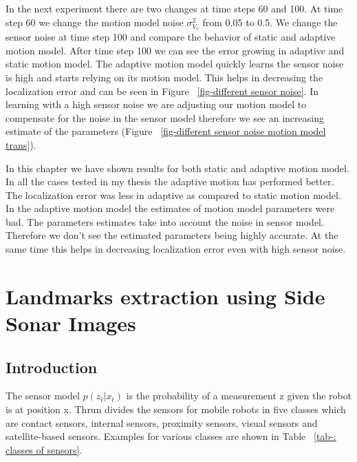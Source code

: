 \documentclass[12pt]{dalcsthesis}
\begin{document}
In the next experiment there are two changes at time steps 60 and 100. At time step 60 we change the motion model noise $\sigma_{V_{v}}^2$ from 0.05 to 0.5. We change the sensor noise  at time step 100 and compare the behavior of static and adaptive motion model. After time step 100 we can see the error growing in adaptive and static motion model. The adaptive motion model quickly learns the sensor noise is high and starts relying on its motion model. This helps in decreasing the localization error and can be seen in Figure ~\ref{fig-different sensor noise}. In learning with a high sensor noise we are adjusting our motion model to compensate for the noise in the sensor model therefore we see an increasing estimate of the parameters (Figure ~\ref{fig-different sensor noise motion model trans}).

In this chapter we have shown results for both static and adaptive motion model. In all the cases tested in my thesis the adaptive motion has performed better. The localization error was less in adaptive as compared to static motion model. In the adaptive motion model the estimates of motion model parameters were bad. The parameters estimates take into account the noise in sensor model. Therefore we don't see the estimated parameters being highly accurate. At the same time this helps in decreasing localization error even with high sensor noise. 


\chapter{Landmarks extraction using Side Sonar Images}
\section{Introduction}
The sensor model $p(z_{t}|x_{t})$ is the probability of a measurement z given the robot is at position x. Thrun \cite{thrun2005probabilistic} divides the sensors for mobile robots in five classes which are contact sensors, internal sensors, proximity sensors, visual sensors and satellite-based sensors. Examples for various classes are shown in Table ~\ref{tab-: classes of sensors}.
\end{document}
